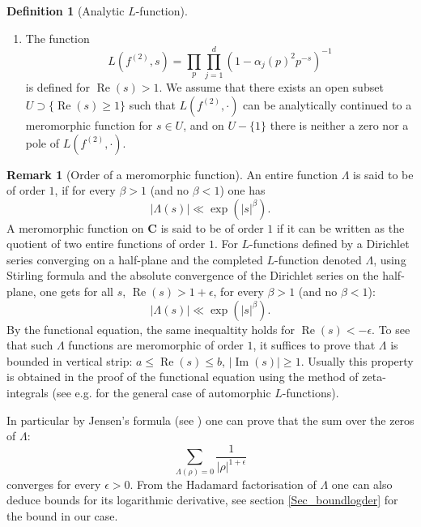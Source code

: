 \documentclass[a4paper,10pt]{amsart}
\theoremstyle{plain}
\theoremstyle{definition}
\newtheorem{defi}{Definition}
\newtheorem{Rk}{Remark}
\begin{document}
\begin{defi}[Analytic $L$-function]
\begin{enumerate}
with $\epsilon(f)=\pm 1$.
Here $\Lambda(\overline{f},1-s)$ is the completed $L$-function associated to 
$L(\overline{f},s) := \sum_{n\geq 1} \overline{\lambda_{f}(n)}n^{-s}$.
\item\label{Hyp_L2isLfunct} The function
$$L(f^{(2)},s) = \prod_{p}\prod_{j=1}^{d}\left(1-\alpha_{j}(p)^{2}p^{-s}\right)^{-1}$$
is defined for $\operatorname{Re}(s)>1$.
We assume that there exists an open subset 
$U \supset \lbrace\operatorname{Re}(s)\geq 1\rbrace$ such that
$L(f^{(2)},\cdot)$ can be analytically continued to a meromorphic function for $s\in U$,
and on $U-\lbrace 1\rbrace$ there is neither a zero nor a pole of $L(f^{(2)},\cdot)$.
\end{enumerate}

\end{defi}

\begin{Rk}[Order of a meromorphic function]
An entire function $\Lambda$ is said to be of order $1$, if for every $\beta>1$ (and no $\beta<1$) one has
$$\lvert \Lambda(s) \rvert\ll \exp(\lvert s\rvert^{\beta}).$$
A meromorphic function on $\mathbf{C}$ is said to be of order $1$ if it can be written as the quotient of two entire functions of order $1$.
For $L$-functions defined by a Dirichlet series converging on a half-plane and the completed $L$-function denoted $\Lambda$,
using Stirling formula and the absolute convergence of the Dirichlet series on the half-plane, one gets for all $s$, $\operatorname{Re}(s) > 1+\epsilon$, for every $\beta>1$ (and no $\beta<1$):
$$\lvert \Lambda(s) \rvert\ll \exp(\lvert s\rvert^{\beta}).$$
By the functional equation, the same inequaltity holds for $\operatorname{Re}(s)< -\epsilon$.
To see that such $\Lambda$ functions are meromorphic of order $1$, it suffices to prove that $\Lambda$ is bounded in vertical strip: 
$a\leq \operatorname{Re}(s)\leq b$, $\lvert\operatorname{Im}(s)\rvert \geq 1$. 
Usually this property is obtained in the proof of the functional equation using the method of zeta-integrals 
(see e.g. \cite[Cor. 13.8, Prop. 13.9]{GodementJacquet} for the general case of automorphic $L$-functions).

In particular by Jensen's formula (see \cite[15.20]{Rudin}) one can prove that the sum over the zeros of $\Lambda$:
$$\sum_{\Lambda(\rho) =0}\frac{1}{\lvert \rho\rvert^{1+\epsilon}}$$
converges for every $\epsilon>0$.
From the Hadamard factorisation of $\Lambda$ one can also deduce bounds for its logarithmic derivative, 
see section \ref{Sec_boundlogder} for the bound in our case.
\end{Rk}
\end{document}
